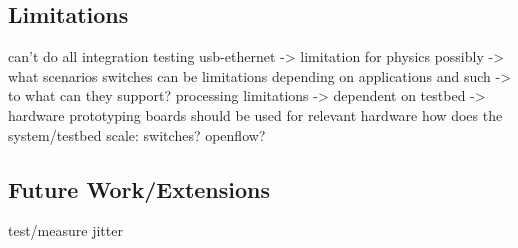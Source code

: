 \subsection{Limitations}
can't do all integration testing
usb-ethernet -> limitation for physics possibly -> what scenarios
switches can be limitations depending on applications and such -> to what can they support?
processing limitations -> dependent on testbed -> hardware prototyping boards should be used for relevant hardware
how does the system/testbed scale: switches? openflow?

\subsection{Future Work/Extensions}
test/measure jitter